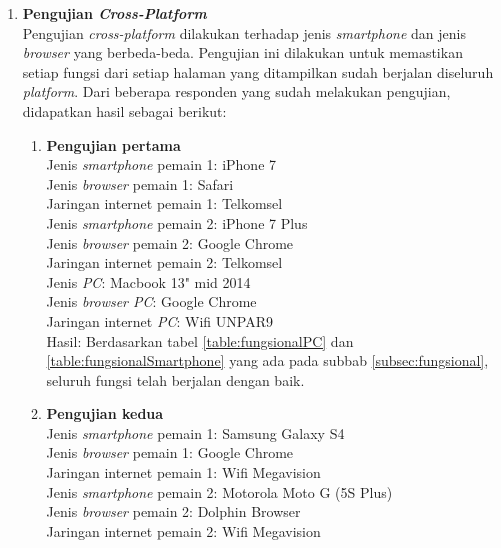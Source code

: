 \begin{enumerate}
	\item \textbf{Pengujian \textit{Cross-Platform}} \\
	Pengujian \textit{cross-platform} dilakukan terhadap jenis \textit{smartphone} dan jenis \textit{browser} yang berbeda-beda. Pengujian ini dilakukan untuk memastikan setiap fungsi dari setiap halaman yang ditampilkan sudah berjalan diseluruh \textit{platform}. Dari beberapa responden yang sudah melakukan pengujian, didapatkan hasil sebagai berikut:
	
	\begin{enumerate}
		\item \textbf{Pengujian pertama} \\
		Jenis \textit{smartphone} pemain 1: iPhone 7 \\
		Jenis \textit{browser} pemain 1: Safari\\
		Jaringan internet pemain 1: Telkomsel\\
		
		Jenis \textit{smartphone} pemain 2: iPhone 7 Plus\\
		Jenis \textit{browser} pemain 2: Google Chrome\\
		Jaringan internet pemain 2: Telkomsel\\
		
		Jenis \textit{PC}: Macbook 13" mid 2014\\
		Jenis \textit{browser PC}: Google Chrome\\
		Jaringan internet \textit{PC}: Wifi UNPAR9\\
		
		Hasil: Berdasarkan tabel \ref{table:fungsionalPC} dan \ref{table:fungsionalSmartphone} yang ada pada subbab \ref{subsec:fungsional}, seluruh fungsi telah berjalan dengan baik.
		
		\item \textbf{Pengujian kedua} \\
		Jenis \textit{smartphone} pemain 1: Samsung Galaxy S4\\
		Jenis \textit{browser} pemain 1: Google Chrome\\
		Jaringan internet pemain 1: Wifi Megavision\\
		
		Jenis \textit{smartphone} pemain 2: Motorola Moto G (5S Plus)\\
		Jenis \textit{browser} pemain 2: Dolphin Browser\\
		Jaringan internet pemain 2: Wifi Megavision\\
		

\end{enumerate}
\end{enumerate}
